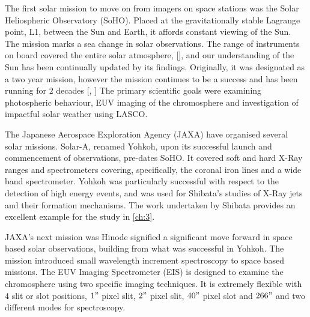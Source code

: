 The first solar mission to move on from imagers on space stations was the Solar Heliospheric Observatory (SoHO).
Placed at the gravitationally stable Lagrange point, L1, between the Sun and Earth, it affords constant viewing of the Sun.
The mission marks a sea change in solar observations.
The range of instruments on board covered the entire solar atmosphere, [\cite{StCyr1995}], and our understanding of the Sun has been continually updated by its findings.
Originally, it was designated as a two year mission, however the mission continues to be a success and has been running for $2$ decades [\cite{Fleck2006}, \cite{Fleck2016}]
The primary scientific goals were examining photospheric behaviour, EUV imaging of the chromosphere and investigation of impactful solar weather using LASCO.



The Japanese Aerospace Exploration Agency (JAXA) have organised several solar missions.
Solar-A, renamed Yohkoh, \cite{Tsuneta1991} upon its successful launch and commencement of observations, pre-dates SoHO.
It covered soft and hard X-Ray ranges and spectrometers covering, specifically, the coronal iron lines and a wide band spectrometer. 
Yohkoh was particularly successful with respect to the detection of high energy events, and was used for Shibata's studies of X-Ray jets and their formation mechanisms.
The work undertaken by Shibata provides an excellent example for the study in \ref{ch:3}.
 
JAXA's next mission was Hinode signified a significant move forward in space based solar observations, building from what was successful in Yohkoh.
The mission introduced small wavelength increment spectroscopy to space based missions.
The EUV Imaging Spectrometer (EIS) is designed to examine the chromosphere using two specific imaging techniques.
It is extremely flexible with 4 slit or slot positions, $1"$ pixel slit, $2"$ pixel slit, $40"$ pixel slot and $266"$ and two different modes for spectroscopy.

